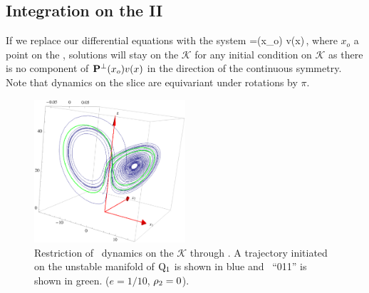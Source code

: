 {\subsection{Integration on the {\slice} II}

If we replace our differential equations  with the system
\beq
	=\PperpOp(x_o) v(x)\,,
	\label{eq:difeqTransvII}
\eeq
where $x_o$ a point on the {\slice},
solutions will stay on the {\slice} $\mathcal{K}$ for any initial condition on $\mathcal{K}$
as there is no component of $\mathbf{P}^{\perp}(x_o) v(x)$ in the direction of the continuous symmetry.
Note that dynamics on the slice are equivariant under rotations by $\pi$.


\begin{figure}[ht]
\begin{center}
\includegraphics[width=0.5\textwidth, clip=true]{../figs/CLEtransvRPO}
\end{center}
\caption[\CLe\ desymmetrization with transverse integration II]{
Restriction of \CLe\ dynamics on the {\slice} $\mathcal{K}$ through
. A trajectory initiated on the unstable
manifold of $\mathrm{Q}_{1}$ is shown in blue and \rpo\ ``011'' is shown
in green.
($e=1/10$, $\rho_2=0$).
    }
\label{fig:CLEtransvII}
\end{figure}

}%
